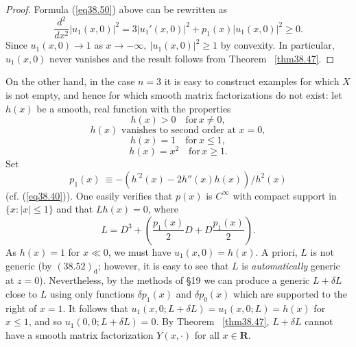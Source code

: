 \documentclass{surv-l}
\theoremstyle{plain}
\theoremstyle{definition}
\numberwithin{equation}{chapter}
\begin{document}
\begin{proof} Formula (\ref{eq38.50}) above can be rewritten as
\begin{equation*}
\frac{d^{2}}{dx^{2}}|u_{1}(x, 0)|^{2}=3|u_{1}'(x, 0)|^{2}+p_{1}(x)|u_{1}(x, 0)|^{2}\geq 0.
\end{equation*}
Since $u_{1} (x,0)\rightarrow 1$ as $ x\rightarrow-\infty,\ |u_{1}(x,0)|^{2}\geq 1$ by convexity. In particular, $u_{1}(x, 0)$ never vanishes and the result follows from Theorem ~\ref{thm38.47}.
\end{proof}
On the other hand, in the case $n=3$ it is easy to construct examples for which $X$ is not empty, and hence for which smooth matrix factorizations do not exist: let $h(x)$ be a smooth, real function with the properties
\renewcommand\theequation{38.52$_{\mathrm{a}}$}
\begin{equation}
h(x) >0\quad \mathrm{for}\, x\neq 0,
\end{equation}
\renewcommand\theequation{38.52$_{\mathrm{b}}$}
\begin{equation}
h(x) \text{ vanishes to second order at } x=0,
\end{equation}
\renewcommand\theequation{38.52$_{\mathrm{c}}$}
\begin{equation}
h(x)=1\quad \mathrm{for}\ x\leq 1,
\end{equation}
\renewcommand\theequation{38.52$_{\mathrm{d}}$}
\begin{equation}
h(x)=x^{2}\quad \mathrm{for}\, x\geq 1.
\end{equation}
Set
\renewcommand\theequation{38.\arabic{equation}}
\setcounter{equation}{52}
\begin{equation}\label{eq38.53}
p_{1}(x)\ \equiv - (h^{\prime2}(x) - 2h''(x)h(x))/h^{2}(x)
\end{equation}
(cf. (\ref{eq38.40})). One easily verifies that $p(x)$ is $C^{\infty}$ with compact support in $\{x : |x|\leq 1\}$ and that $Lh(x)=0$, where
\begin{equation}\label{eq38.54}
L=D^{3}+\left(\frac{p_{1}(x)}{2}D + D\frac{p_{1}(x)}{2}\right).
\end{equation}
As $h(x)=1$ for $x\ll 0$, we must have $u_{1}(x, 0)=h(x)$. A priori, $L$ is not generic (by $(38.52)_{\mathrm{d}}$; however, it is easy to see that $L$ is \emph{automatically} generic at $z=0$). Nevertheless, by the methods of \S19 we can produce a generic $L+\delta L$ close to $L$ using only functions $\delta p_{1}(x)$ and $\delta p_{0}(x)$ which are supported to the right of $x=1$. It follows that $u_{1} (x,0; L+\delta L)=u_{1}(x, 0; L)=h(x)$ for $x\leq 1$, and so $u_{1} (0, 0;L+\delta L)=0$. By Theorem ~\ref{thm38.47}, $L+\delta L$ cannot have a smooth matrix factorization $Y(x, \cdot)$ for all $x\in \textbf{R}$.
\end{document}
